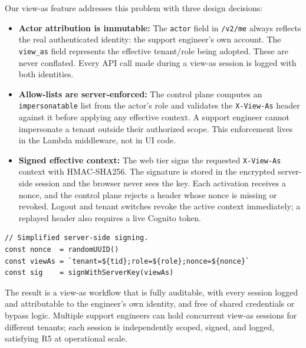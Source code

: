 \documentclass[10pt,journal]{IEEEtran}
\newcommand{\viewas}{view-as}
\newcommand{\code}[1]{{\small\textcolor{CausifyBlue}{\texttt{#1}}}}
\begin{document}
Our \viewas{} feature addresses this problem with three design decisions:
\begin{itemize}[label=\textbullet, leftmargin=1.2em, topsep=2pt, itemsep=2pt, parsep=0pt, partopsep=0pt]
  \item \textbf{Actor attribution is immutable:} The \code{actor} field in
    \code{/v2/me} always reflects the real authenticated identity: the support
    engineer's own account. The \code{view\_as} field represents the effective
    tenant/role being adopted. These are never conflated. Every API call made
    during a view-as session is logged with both identities.

  \item \textbf{Allow-lists are server-enforced:} The control plane computes an
    \code{impersonatable} list from the actor's role and validates the
    \code{X-View-As} header against it before applying any effective context.
    A support engineer cannot impersonate a tenant outside their authorized
    scope. This enforcement lives in the Lambda middleware, not in UI code.

  \item \textbf{Signed effective context:} The web tier signs the requested
    \code{X-View-As} context with HMAC-SHA256. The signature is stored in the
    encrypted server-side session and the browser never sees the key. Each
    activation receives a nonce, and the control plane rejects a header whose
    nonce is missing or revoked. Logout and tenant switches revoke the active
    context immediately; a replayed header also requires a live Cognito token.
\end{itemize}

\noindent\begin{minipage}{\columnwidth}
\begin{lstlisting}
// Simplified server-side signing.
const nonce  = randomUUID()
const viewAs = `tenant=${tid};role=${role};nonce=${nonce}`
const sig    = signWithServerKey(viewAs)
\end{lstlisting}
\end{minipage}

The result is a \viewas{} workflow that is fully auditable, with every
session logged and attributable to the engineer's own identity, and free
of shared credentials or bypass logic.
Multiple support engineers can hold concurrent view-as sessions for different
tenants; each session is independently scoped, signed, and logged, satisfying
R5 at operational scale.

\end{document}
